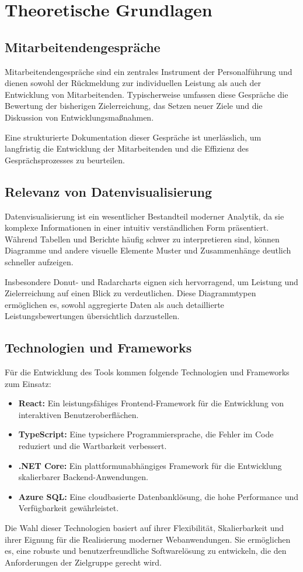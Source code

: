\chapter{Theoretische Grundlagen}
\label{chap:theoretische-grundlagen}

\section{Mitarbeitendengespräche}
Mitarbeitendengespräche sind ein zentrales Instrument der Personalführung und dienen sowohl der Rückmeldung zur individuellen Leistung als auch der Entwicklung von Mitarbeitenden. Typischerweise umfassen diese Gespräche die Bewertung der bisherigen Zielerreichung, das Setzen neuer Ziele und die Diskussion von Entwicklungsmaßnahmen.

Eine strukturierte Dokumentation dieser Gespräche ist unerlässlich, um langfristig die Entwicklung der Mitarbeitenden und die Effizienz des Gesprächsprozesses zu beurteilen.

\section{Relevanz von Datenvisualisierung}
Datenvisualisierung ist ein wesentlicher Bestandteil moderner Analytik, da sie komplexe Informationen in einer intuitiv verständlichen Form präsentiert. Während Tabellen und Berichte häufig schwer zu interpretieren sind, können Diagramme und andere visuelle Elemente Muster und Zusammenhänge deutlich schneller aufzeigen. 

Insbesondere Donut- und Radarcharts eignen sich hervorragend, um Leistung und Zielerreichung auf einen Blick zu verdeutlichen. Diese Diagrammtypen ermöglichen es, sowohl aggregierte Daten als auch detaillierte Leistungsbewertungen übersichtlich darzustellen.

\section{Technologien und Frameworks}
Für die Entwicklung des Tools kommen folgende Technologien und Frameworks zum Einsatz:
\begin{itemize}
    \item \textbf{React:} Ein leistungsfähiges Frontend-Framework für die Entwicklung von interaktiven Benutzeroberflächen.
    \item \textbf{TypeScript:} Eine typsichere Programmiersprache, die Fehler im Code reduziert und die Wartbarkeit verbessert.
    \item \textbf{.NET Core:} Ein plattformunabhängiges Framework für die Entwicklung skalierbarer Backend-Anwendungen.
    \item \textbf{Azure SQL:} Eine cloudbasierte Datenbanklösung, die hohe Performance und Verfügbarkeit gewährleistet.
\end{itemize}

Die Wahl dieser Technologien basiert auf ihrer Flexibilität, Skalierbarkeit und ihrer Eignung für die Realisierung moderner Webanwendungen. Sie ermöglichen es, eine robuste und benutzerfreundliche Softwarelösung zu entwickeln, die den Anforderungen der Zielgruppe gerecht wird.
